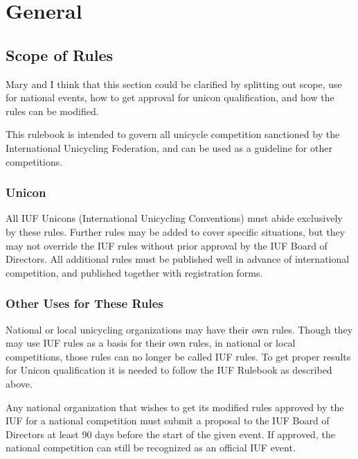 \chapter{General}

\section{Scope of Rules}

\begin{comment2016}
Mary and I think that this section could be clarified by splitting out scope, use for national events, how to get approval for unicon qualification, and how the rules can be modified.
\end{comment2016}

This rulebook is intended to govern all unicycle competition sanctioned by the International Unicycling Federation, and can be used as a guideline for other competitions.

\subsection{Unicon \label{subsec:general_scope-of-rules_unicon}}

All IUF Unicons (International Unicycling Conventions) must abide exclusively by these rules.
Further rules may be added to cover specific situations, but they may not override the IUF rules without prior approval by the IUF Board of Directors.
All additional rules must be published well in advance of international competition, and published together with registration forms.

\subsection{Other Uses for These Rules}

National or local unicycling organizations may have their own rules.
Though they may use IUF rules as a basis for their own rules, in national or local competitions, those rules can no longer be called IUF rules.
To get proper results for Unicon qualification it is needed to follow the IUF Rulebook as described above.

Any national organization that wishes to get its modified rules approved by the IUF for a national competition must submit a proposal to the IUF Board of Directors at least 90 days before the start of the given event.
If approved, the national competition can still be recognized as an official IUF event.

